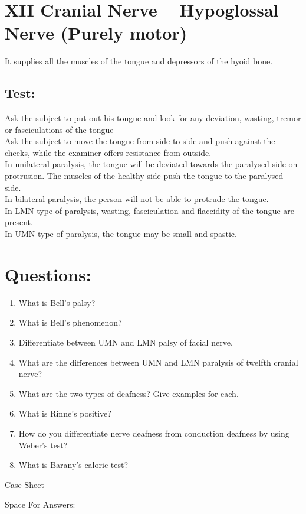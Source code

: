 \documentclass[a4paper,12pt,openany,twoside]{book}
\newcommand{\blankpageForCaseSheet}{
	\newpage
	\thispagestyle{plain}
	\begin{center}
		\huge Case Sheet 
	\end{center}
	\newpage
	\thispagestyle{plain}
	\mbox{}
	}
\newcommand{\blankpageForAnswers}{
	\newpage
	\thispagestyle{plain}
	\begin{center}
		\Large Space For Answers: 
	\end{center}
	}
\begin{document}
\section*{XII Cranial Nerve – Hypoglossal Nerve (Purely motor)}

	It supplies all the muscles of the tongue and depressors of the hyoid bone.
\subsection*{Test:}
Ask the subject to put out his tongue and look for any deviation, wasting, tremor or fasciculations of the tongue\\
Ask the subject to move the tongue from side to side and push against the cheeks, while the examiner offers resistance from outside.\\
In unilateral paralysis, the tongue will be deviated towards the paralysed side on protrusion. The muscles of the healthy side push the tongue to the paralysed side.\\
In bilateral paralysis, the person will not be able to protrude the tongue.\\
In LMN type of paralysis, wasting, fasciculation and flaccidity of the tongue are present.\\
In UMN type of paralysis, the tongue may be small and spastic.

\section*{Questions:}
\begin{enumerate}
\item{ What is Bell’s palsy?}
\item{ What is Bell’s phenomenon?}
\item{ Differentiate between UMN and LMN palsy of facial nerve.}
\item{ What are the differences between UMN and LMN paralysis of twelfth cranial nerve?}
\item{ What are the two types of deafness? Give examples for each.}
\item{ What is Rinne’s positive?}
\item{ How do you differentiate nerve deafness from conduction deafness by using Weber’s test?}
\item{ What is Barany’s caloric test?}
\end{enumerate}
\blankpageForCaseSheet
\blankpageForAnswers
	
\end{document}
